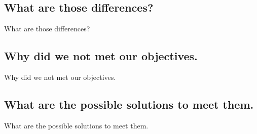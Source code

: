 \documentclass{beamer}
\begin{document}
\subsection{What are those differences?}
\begin{frame}{What are those differences?}

\end{frame}

\subsection{Why did we not met our objectives.}
\begin{frame}{Why did we not met our objectives.}

\end{frame}

\subsection{What are the possible solutions to meet them.}
\begin{frame}{What are the possible solutions to meet them.}

\end{frame}
\end{document}
